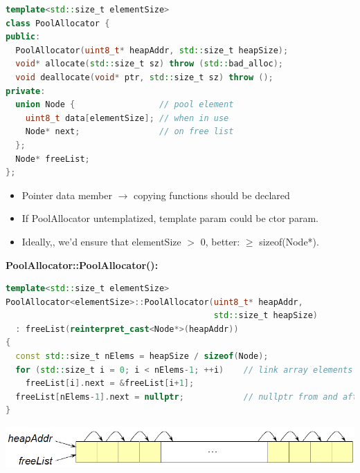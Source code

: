 \begin{lstlisting}[language=C++]
template<std::size_t elementSize>
class PoolAllocator {
public:
  PoolAllocator(uint8_t* heapAddr, std::size_t heapSize);
  void* allocate(std::size_t sz) throw (std::bad_alloc);
  void deallocate(void* ptr, std::size_t sz) throw ();
private:
  union Node {                 // pool element
    uint8_t data[elementSize]; // when in use
    Node* next;                // on free list
  };
  Node* freeList;
};
\end{lstlisting}
\begin{itemize}
  \item Pointer data member $\rightarrow$ copying functions should be declared
  \item If PoolAllocator untemplatized, template param could be ctor param.
  \item Ideally,, we'd ensure that elementSize $>$ 0, better: $\geq$ sizeof(Node*).
\end{itemize}

\textbf{PoolAllocator::PoolAllocator():}
\begin{lstlisting}[language=C++]
template<std::size_t elementSize>
PoolAllocator<elementSize>::PoolAllocator(uint8_t* heapAddr,
                                          std::size_t heapSize)
  : freeList(reinterpret_cast<Node*>(heapAddr))
{
  const std::size_t nElems = heapSize / sizeof(Node);
  for (std::size_t i = 0; i < nElems-1; ++i)    // link array elements
    freeList[i].next = &freeList[i+1];
  freeList[nElems-1].next = nullptr;            // nullptr from and after C++11
}
\end{lstlisting}
\includegraphics[width=0.7\linewidth]{images/AdvancedCPP/poolAllocatorConstructor}

